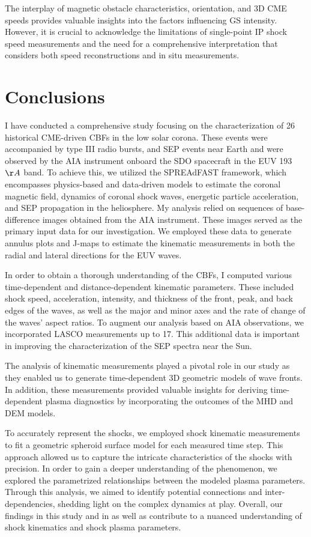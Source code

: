 The interplay of magnetic obstacle characteristics, orientation, and 3D CME speeds provides valuable insights into the factors influencing GS intensity. However, it is crucial to acknowledge the limitations of single-point IP shock speed measurements and the need for a comprehensive interpretation that considers both speed reconstructions and in situ measurements.

\section{Conclusions}
I have conducted a comprehensive study focusing on the characterization of 26 historical CME-driven CBFs in the low solar corona. These events were accompanied by type III radio bursts, and SEP events near Earth and were observed by the AIA instrument onboard the SDO spacecraft in the EUV 193 $\AA$ band. To achieve this, we utilized the SPREAdFAST framework, which encompasses physics-based and data-driven models to estimate the coronal magnetic field, dynamics of coronal shock waves, energetic particle acceleration, and SEP propagation in the heliosphere.
My analysis relied on sequences of base-difference images obtained from the AIA instrument. These images served as the primary input data for our investigation. We employed these data to generate annulus plots and J-maps to estimate the kinematic measurements in both the radial and lateral directions for the EUV waves.

In order to obtain a thorough understanding of the CBFs, I computed various time-dependent and distance-dependent kinematic parameters. These included shock speed, acceleration, intensity, and thickness of the front, peak, and back edges of the waves, as well as the major and minor axes and the rate of change of the waves' aspect ratios. To augment our analysis based on AIA observations, we incorporated LASCO measurements up to 17\rsun. This additional data is important in improving the characterization of the SEP spectra near the Sun.

The analysis of kinematic measurements played a pivotal role in our study as they enabled us to generate time-dependent 3D geometric models of wave fronts. In addition, these measurements provided valuable insights for deriving time-dependent plasma diagnostics by incorporating the outcomes of the MHD and DEM models.

To accurately represent the shocks, we employed shock kinematic measurements to fit a geometric spheroid surface model for each measured time step. This approach allowed us to capture the intricate characteristics of the shocks with precision.
In order to gain a deeper understanding of the phenomenon, we explored the parametrized relationships between the modeled plasma parameters. Through this analysis, we aimed to identify potential connections and inter-dependencies, shedding light on the complex dynamics at play.
Overall, our findings in this study and in \citet{kozarev_2022} as well as \citet{stepanyuk_2022} contribute to a nuanced understanding of shock kinematics and shock plasma parameters.

